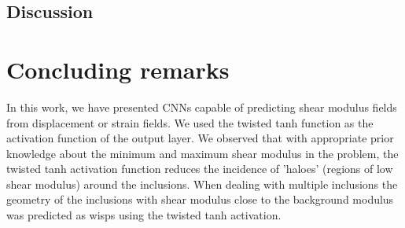 \documentclass[12pt]{article}
\begin{document}
\subsection{Discussion}
%
\section{Concluding remarks}
In this work, we have presented CNNs capable of predicting shear modulus fields from displacement or strain fields. We used the twisted tanh function as the activation function of the output layer. We observed that with appropriate prior knowledge about the minimum and maximum shear modulus in the problem, the twisted tanh activation function reduces the incidence of 'haloes' (regions of low shear modulus) around the inclusions. When dealing with multiple inclusions the geometry of the inclusions with shear modulus close to the background modulus was predicted as wisps using the twisted tanh activation.    
\end{document}
